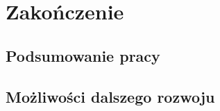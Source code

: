 \chapter*{Zakończenie}\label{ch:ending}
\section{Podsumowanie pracy}\label{sec:summary}

\section{Możliwości dalszego rozwoju}\label{sec:future-development}
\thispagestyle{normal}
